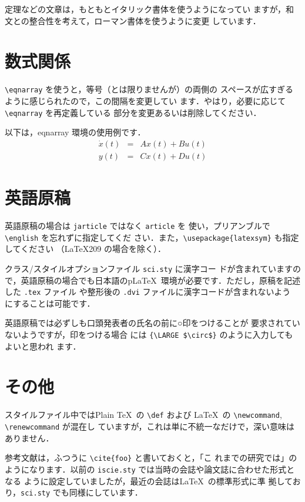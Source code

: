 \documentclass{jarticle}
\begin{document}
定理などの文章は，もともとイタリック書体を使うようになってい
ますが，和文との整合性を考えて，ローマン書体を使うように変更
しています．

\section{数式関係}
\verb+\eqnarray+ を使うと，等号（とは限りませんが）の両側の
スペースが広すぎるように感じられたので，この間隔を変更してい
ます．やはり，必要に応じて \verb+\eqnarray+ を再定義している
部分を変更あるいは削除してください．

以下は，eqnarray 環境の使用例です．
\begin{eqnarray}
 \dot{x}(t) & = & A x(t) + B u(t) \\
 y(t) & = & C x(t) + D u(t)
\end{eqnarray}

\section{英語原稿}

英語原稿の場合は \verb+jarticle+ ではなく \verb+article+ を
使い，プリアンブルで \verb+\english+ を忘れずに指定してくだ
さい．また，\verb+\usepackage{latexsym}+ も指定してください
（\LaTeX 209 の場合を除く）．

クラス/スタイルオプションファイル \verb+sci.sty+ に漢字コー
ドが含まれていますので，英語原稿の場合でも日本語のp\LaTeX\ 
環境が必要です．ただし，原稿を記述した \verb+.tex+ ファイル
や整形後の \verb+.dvi+ ファイルに漢字コードが含まれないよう
にすることは可能です．

英語原稿では必ずしも口頭発表者の氏名の前に○印をつけることが
要求されていないようですが，印をつける場合
には \verb+{\LARGE $\circ$}+ のように入力してもよいと思われ
ます．

\section{その他}

スタイルファイル中ではPlain \TeX\ の \verb+\def+ および 
\LaTeX\ の \verb+\newcommand+, \verb+\renewcommand+ が混在し
ていますが，これは単に不統一なだけで，深い意味はありません．

参考文献は，ふつうに \verb+\cite{foo}+ と書いておくと，「こ
れまでの研究\cite{foo}では」のようになります．以前の 
\verb+iscie.sty+ では当時の会誌や論文誌に合わせた形式となる
ように設定していましたが，最近の会誌は\LaTeX\ の標準形式に準
拠しており，\verb+sci.sty+ でも同様にしています．
\end{document}
